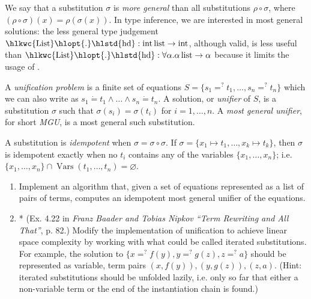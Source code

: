 \documentclass{article}
\newcommand{\tmem}[1]{{\em #1\/}}
\newcommand{\tmop}[1]{\ensuremath{\operatorname{#1}}}
\begin{document}
\begin{exercise}
  We say that a substitution $\sigma$ is {\tmem{more general}} than all
  substitutions $\rho \circ \sigma$, where $(\rho \circ \sigma) (x) = \rho
  (\sigma (x))$. In type inference, we are interested in most general
  solutions: the less general type judgement
  $\text{{\hlkwc{List}}{\hlopt{.}}{\hlstd{hd}}} : \tmop{int} \tmop{list}
  \rightarrow \tmop{int}$, although valid, is less useful than
  $\text{{\hlkwc{List}}{\hlopt{.}}{\hlstd{hd}}} : \forall \alpha . \alpha
  \tmop{list} \rightarrow \alpha$ because it limits the usage of
  {}{}{}.
  
  A {\tmem{unification problem}} is a finite set of equations $S = \{ s_1 =^?
  t_1, \ldots, s_n =^? t_n \}$ which we can also write as $s_1 \dot{=} t_1
  \wedge \ldots \wedge s_n \dot{=} t_n$. A solution, or {\tmem{unifier}} of
  $S$, is a substitution $\sigma$ such that $\sigma (s_i) = \sigma (t_i)$ for
  $i = 1, \ldots, n$. A {\tmem{most general unifier}}, for short {\tmem{MGU}},
  is a most general such substitution.
  
  A substitution is {\tmem{idempotent}} when $\sigma = \sigma \circ \sigma$.
  If $\sigma = \{ x_1 \mapsto t_1, \ldots, x_k \mapsto t_k \}$, then $\sigma$
  is idempotent exactly when no $t_i$ contains any of the variables $\{ x_1,
  \ldots, x_n \}$; i.e. $\{ x_1, \ldots, x_n \} \cap \tmop{Vars} (t_1, \ldots,
  t_n) = \varnothing$.
  \begin{enumerate}
    \item Implement an algorithm that, given a set of equations represented as
    a list of pairs of terms, computes an idempotent most general unifier of
    the equations.
    
    \item * (Ex. 4.22 in {\tmem{Franz Baader and Tobias Nipkov ``Term
    Rewriting and All That''}}, p. 82.) Modify the implementation of
    unification to achieve linear space complexity by working with what could
    be called iterated substitutions. For example, the solution to $\{ x =^? f
    (y), y =^? g (z), z =^? a \}$ should be represented as variable, term
    pairs $(x, f (y)), (y, g (z)), (z, a)$. (Hint: iterated substitutions
    should be unfolded lazily, i.e. only so far that either a non-variable
    term or the end of the instantiation chain is found.)
  \end{enumerate}
\end{exercise}
\end{document}
